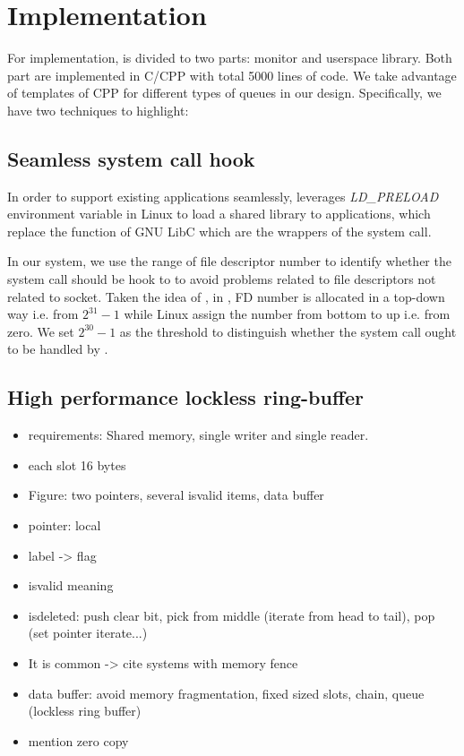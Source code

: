\section{Implementation}
\label{sec:implementation}

For implementation, \libipc is divided to two parts: monitor and userspace library. Both part are implemented in C/CPP with total 5000 lines of code. We take advantage of templates of CPP for different types of queues in our design. Specifically, we have two techniques to highlight:
\subsection{Seamless system call hook}
\label{subsec:syscall-hook}
In order to support existing applications seamlessly, \libipc leverages \textit{LD\_PRELOAD} environment variable in Linux to load a shared library to applications, which replace the function of GNU LibC which are the wrappers of the system call. 

In our system, we use the range of file descriptor number to identify whether the system call should be hook to \libipc to avoid problems related to file descriptors not related to socket. Taken the idea of \cite{huang2017high}, in \libipc, FD number is allocated in a top-down way i.e. from $2^{31}-1$ while Linux assign the number from bottom to up i.e. from zero. We set $2^{30} - 1 $ as the threshold to distinguish whether the system call ought to be handled by \libipc.





\subsection{High performance lockless ring-buffer}
\label{subsec:lockless-queue}



\begin{itemize}
	\item requirements: Shared memory, single writer and single reader.
	\item each slot 16 bytes
	\item Figure: two pointers, several isvalid items, data buffer
	\item pointer: local
	\item label -> flag
	\item isvalid meaning
	\item isdeleted: push clear bit, pick from middle (iterate from head to tail), pop (set pointer iterate...)
	\item It is common -> cite systems with memory fence
	\item data buffer: avoid memory fragmentation, fixed sized slots, chain, queue (lockless ring buffer)
	\item mention zero copy
\end{itemize}

